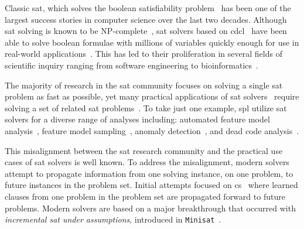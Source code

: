 \label{section:motivation}
%
%
Classic \ac{sat}, which solves the boolean satisfiability problem~\cite{BBH+09}
has been one of the largest success stories in computer science over the last
two decades. Although \ac{sat} solving is known to be
NP-complete~\cite{10.1145/800157.805047}, \ac{sat} solvers based on
\ac{cdcl}~\cite{Marques-Silva:1999:GSA:304491.304506,Silva:1997:GNS:244522.244560,10.5555/1867406.1867438}
have been able to solve boolean formulae with millions of variables quickly
enough for use in real-world applications~\cite{10.5555/1557461}. This has led
to their proliferation in several fields of scientific inquiry ranging from
software engineering to
bioinformatics~\cite{10.1007/11814948_16,10.1007/978-3-642-31612-8_12}.

The majority of research in the \ac{sat} community focuses on solving a single
\ac{sat} problem as fast as possible, yet many practical applications of
\ac{sat}
solvers~\cite{silva1997robust,10.1007/3-540-44798-9_4,10.1145/378239.379019,10.1145/1698759.1698762,Een_asingle-instance,een2003temporal,10.5555/1998496.1998520}
require solving a set of related \ac{sat}
problems~\cite{10.1007/3-540-44798-9_4, silva1997robust, een2003temporal}. To
take just one example, \acl{spl} utilize \ac{sat} solvers for a diverse range of
analyses including: automated feature model
analysis~\cite{useBTRC05,GBT+19,TAK+:CSUR14}, feature model
sampling~\cite{MKR+:ICSE16,VAT+:SPLC18}, anomaly
detection~\cite{AKTS:FOSD16,KAT:TR16,MNS+:SPLC17}, and dead code
analysis~\cite{TLSS:EuroSys11}.

This misalignment between the \ac{sat} research community and the practical use
cases of \ac{sat} solvers is well known. To address the misalignment, modern
solvers attempt to propagate information from one solving instance, on one
problem, to future instances in the problem set. Initial attempts focused on
\ac{cs}~\cite{10.1007/3-540-44798-9_4,10.1145/378239.379019} where learned
clauses from one problem in the problem set are propagated forward to future
problems. Modern solvers are based on a major breakthrough that occurred with
\emph{incremental \ac{sat} under assumptions}, introduced in
\texttt{Minisat}~\cite{10.1007/978-3-540-24605-3_37}.

